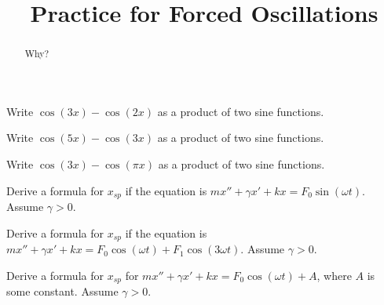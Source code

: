 \documentclass{ximera}
\title{Practice for Forced Oscillations}
\begin{document}
\begin{abstract}
    Why?
\end{abstract}
\maketitle

 

\begin{exercise}
    Write $\cos(3x) - \cos(2x)$ as a product of two sine functions.
\end{exercise}

\begin{exercise}
    Write $\cos(5x) - \cos(3x)$ as a product of two sine functions.
\end{exercise}

\begin{exercise}
    Write $\cos(3x) - \cos(\pi x)$ as a product of two sine functions.
\end{exercise}

\begin{exercise}
    Derive a formula for $x_{sp}$ if the equation is $m x'' + \gamma x' + kx = F_0 \sin (\omega t)$.  Assume $\gamma > 0$.
\end{exercise}

\begin{exercise}
    Derive a formula for $x_{sp}$ if the equation is $m x'' + \gamma x' + kx = F_0 \cos (\omega t) + F_1 \cos (3\omega t)$. Assume $\gamma > 0$.
\end{exercise}

\begin{exercise}%
    Derive a formula for $x_{sp}$ for $mx''+\gamma x'+kx = F_0 \cos(\omega t) + A$, where $A$ is some constant.  Assume $\gamma > 0$.
\end{exercise}
\end{document}
